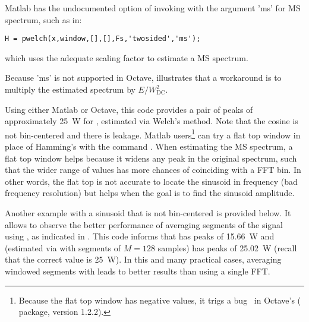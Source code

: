 Matlab has the undocumented option of invoking  with the argument 'ms' for MS spectrum, such as in:
\begin{lstlisting}
H = pwelch(x,window,[],[],Fs,'twosided','ms');
\end{lstlisting}
which uses the adequate scaling factor to estimate a MS spectrum. 

Because 'ms' is not supported in Octave,  illustrates that a workaround is to multiply the estimated spectrum by $E/W_{\textrm{DC}}^2$.


Using either Matlab or Octave, this code provides a pair of peaks of approximately 25~W for , estimated via Welch's method. 
Note that the cosine is not bin-centered and there is leakage. Matlab users\footnote{Because the flat top window has negative values, it trigs a bug~ in Octave's  ( package, version 1.2.2).} can try a flat top window in place of  Hamming's with the command . When estimating the MS spectrum, a flat top window helps because it widens any peak in the original spectrum, such that the wider range of values has more chances of coinciding with a FFT bin. In other words, the flat top is not accurate to locate the sinusoid in frequency (bad frequency resolution) but helps when the goal is to find the sinusoid amplitude.


Another example with a sinusoid that is not bin-centered is provided below. It allows to observe the better performance of averaging segments of the signal using , as indicated in .
This code informs that  has peaks of 15.66~W and  (estimated via  with segments of $M=128$ samples) has peaks of 25.02~W (recall that the correct value is 25~W).
In this and many practical cases, averaging windowed segments with  leads to better results than using a single FFT.
\eApplication 

